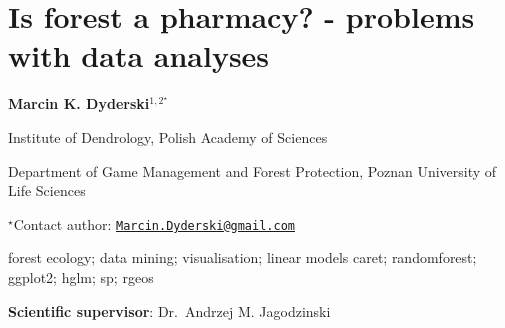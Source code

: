 \documentclass[\main/boa.tex]{subfiles}
\begin{document}
\section{Is forest a pharmacy? - problems with data analyses}

\begin{center}
  {\bf Marcin K. Dyderski$^{1, 2^\star}$}
\end{center}

\vskip 0.3cm

\begin{affiliations}
\begin{enumerate}
\begin{minipage}{0.915\textwidth}
\centering
\item Institute of Dendrology, Polish Academy of Sciences \\[-2pt]
\item Department of Game Management and Forest Protection, Poznan University
of Life Sciences \\[-2pt]
\end{minipage}
\end{enumerate}
$^\star$Contact author: \href{mailto:Marcin.Dyderski@gmail.com}{\nolinkurl{Marcin.Dyderski@gmail.com}}\\
\end{affiliations}

\vskip 0.5cm

\begin{minipage}{0.915\textwidth}
\keywords forest ecology; data mining; visualisation; linear models
\packages caret; randomforest; ggplot2; hglm; sp; rgeos
\end{minipage}

\vskip 0.8cm

\textbf{Scientific supervisor}: Dr.~Andrzej M. Jagodzinski
\end{document}
